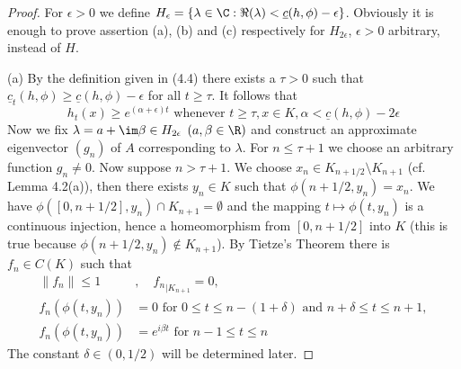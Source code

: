 \begin{proof}
	For $\epsilon > 0$ we define $H_{\epsilon} = \{\lambda \in \C : \Re(\lambda) < \underline{c}(h,\phi)-\epsilon\}$.
	Obviously it is enough to prove assertion (a), (b) and (c) respectively for $H_{2\epsilon}$, $\epsilon> 0$ arbitrary, instead of $H$.
%
%
%
%
%
%
%

	(a) By the definition given in (4.4) there exists a $\tau > 0$ such that $\underline{c}_{t}(h,\phi) \geq \underline{c}(h,\phi) - \epsilon$ for all $t \geq \tau$.
	It follows that
	\begin{equation}\label{eq:b3-4.5}
		h_{t}(x) \geq e^{(\alpha + \epsilon)t} \text{ whenever } t \geq \tau, x \in K, \alpha < \underline{c}(h,\phi)-2\epsilon
	\end{equation}
	Now we fix $\lambda = a + \im\beta \in H_{2\epsilon}$ $(a,\beta \in \R)$ and construct an approximate eigenvector $(g_{n})$ of $A$ corresponding to $\lambda$.
	For $n \leq \tau + 1$ we choose an arbitrary function $g_{n} \neq 0$.
	Now suppose $n > \tau + 1$.
	We choose $x_{n} \in K_{n+1/2} \setminus K_{n+1}$ (cf. Lemma 4.2(a)), then there exists $y_{n} \in K$ such that $\phi(n+1/2,y_{n}) = x_{n}$.
	We have $\phi([0,n+1/2],y_{n}) \cap K_{n+1} = \emptyset$ and the mapping $t \mapsto \phi(t,y_{n})$ is a continuous injection, hence a homeomorphism from $[0,n+1/2]$ into $K$ (this is true because $\phi(n+1/2,y_{n}) \notin K_{n+1}$).
	By Tietze's Theorem there is $f_{n} \in C(K)$ such that
	\begin{equation}\label{eq:b3-4.6}
		\begin{aligned}
			\|f_{n}\| \leq 1 &, \quad {f_{n}}_{|K_{n+1}} = 0, \\
			f_{n}(\phi(t,y_{n})) &= 0 \text{ for } 0 \leq t \leq n-(1+\delta) \text{ and } n+\delta \leq t \leq n+1, \\
			f_{n}(\phi(t,y_{n})) &= e^{i\beta t} \text{ for } n-1 \leq t \leq n
		\end{aligned}
	\end{equation}
	The constant $\delta \in (0,1/2)$ will be determined later.
	

\end{proof}
